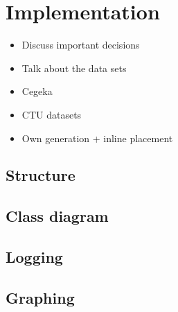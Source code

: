 
\chapter{Implementation} %

\label{implementation} %

\begin{itemize}
\item Discuss important decisions
\item Talk about the data sets
\end{itemize}

\begin{itemize}
\item Cegeka
\item CTU datasets
\item Own generation + inline placement
\end{itemize}

\section{Structure}

\section{Class diagram}

\section{Logging}

\section{Graphing}